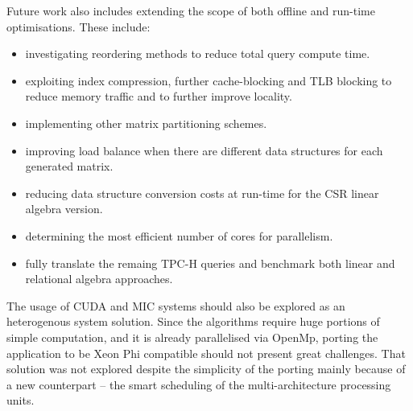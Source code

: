 Future work also includes extending the scope of both offline and run-time optimisations. These include:
\begin{itemize} 
\item investigating reordering methods to reduce total query compute time.
\item exploiting index compression, further cache-blocking and TLB blocking to reduce memory traffic and to further improve locality.
\item implementing other matrix partitioning schemes.
\item improving load balance when there are different data structures for each generated matrix.
\item reducing data structure conversion costs at run-time for the CSR linear algebra version.
\item determining the most efficient  number of cores for parallelism.
\item fully translate the remaing TPC-H queries and benchmark both linear and relational algebra approaches.
\end{itemize}

The usage of CUDA and MIC systems should also be explored as an heterogenous system solution. Since the algorithms require huge portions of simple computation, and it is already parallelised via OpenMp, porting the application to be Xeon Phi compatible should not present great challenges. That solution was not explored despite the simplicity of the porting mainly because of a new counterpart -- the smart scheduling of the multi-architecture processing units.\par 


 

